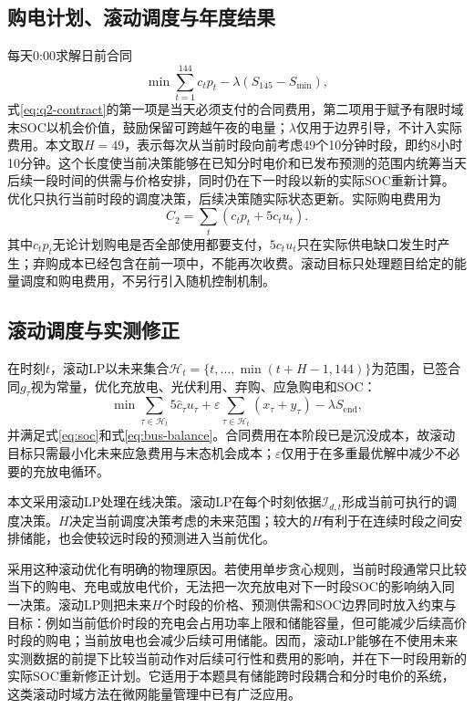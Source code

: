 \documentclass[UTF8,12pt,a4paper]{ctexart}
\theoremstyle{remark}
\begin{document}
\subsection{购电计划、滚动调度与年度结果}
每天0:00求解日前合同
\begin{equation}\min\sum_{t=1}^{144}c_tp_t-\lambda(S_{145}-S_{\min}),\label{eq:q2-contract}\end{equation}
式\eqref{eq:q2-contract}的第一项是当天必须支付的合同费用，第二项用于赋予有限时域末SOC以机会价值，鼓励保留可跨越午夜的电量；$\lambda$仅用于边界引导，不计入实际费用。本文取$H=49$，表示每次从当前时段向前考虑49个10分钟时段，即约8小时10分钟。这个长度使当前决策能够在已知分时电价和已发布预测的范围内统筹当天后续一段时间的供需与价格安排，同时仍在下一时段以新的实际SOC重新计算。优化只执行当前时段的调度决策，后续决策随实际状态更新。实际购电费用为
\begin{equation}C_2=\sum_t(c_tp_t+5c_tu_t).\label{eq:q2-cash}\end{equation}
其中$c_tp_t$无论计划购电是否全部使用都要支付，$5c_tu_t$只在实际供电缺口发生时产生；弃购成本已经包含在前一项中，不能再次收费。滚动目标只处理题目给定的能量调度和购电费用，不另行引入随机控制机制。

\subsection{滚动调度与实测修正}\label{subsec:q2-rolling}
在时刻$t$，滚动LP以未来集合$\mathcal H_t=\{t,\ldots,\min(t+H-1,144)\}$为范围，已签合同$g_\tau$视为常量，优化充放电、光伏利用、弃购、应急购电和SOC：
\begin{equation}
\min \sum_{\tau\in\mathcal H_t}5\widehat c_\tau u_\tau
+\varepsilon\sum_{\tau\in\mathcal H_t}(x_\tau+y_\tau)-\lambda S_{\mathrm{end}},
\label{eq:rolling-obj}
\end{equation}
并满足式\eqref{eq:soc}和式\eqref{eq:bus-balance}。合同费用在本阶段已是沉没成本，故滚动目标只需最小化未来应急费用与末态机会成本；$\varepsilon$仅用于在多重最优解中减少不必要的充放电循环。

本文采用滚动LP处理在线决策。滚动LP在每个时刻依据$\mathcal I_{d,t}$形成当前可执行的调度决策。$H$决定当前调度决策考虑的未来范围；较大的$H$有利于在连续时段之间安排储能，也会使较远时段的预测进入当前优化。

采用这种滚动优化有明确的物理原因。若使用单步贪心规则，当前时段通常只比较当下的购电、充电或放电代价，无法把一次充放电对下一时段SOC的影响纳入同一决策。滚动LP则把未来$H$个时段的价格、预测供需和SOC边界同时放入约束与目标：例如当前低价时段的充电会占用功率上限和储能容量，但可能减少后续高价时段的购电；当前放电也会减少后续可用储能。因而，滚动LP能够在不使用未来实测数据的前提下比较当前动作对后续可行性和费用的影响，并在下一时段用新的实际SOC重新修正计划。它适用于本题具有储能跨时段耦合和分时电价的系统，这类滚动时域方法在微网能量管理中已有广泛应用\cite{silvente2015rolling,elkazaz2020ems}。
\end{document}
